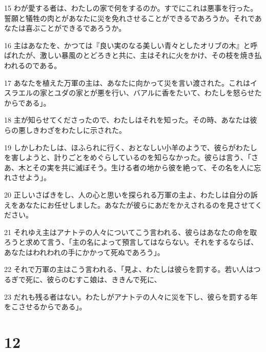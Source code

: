 \par 15 わが愛する者は、わたしの家で何をするのか。すでにこれは悪事を行った。誓願と犠牲の肉とがあなたに災を免れさせることができるであろうか。それであなたは喜ぶことができるであろうか。
\par 16 主はあなたを、かつては『良い実のなる美しい青々としたオリブの木』と呼ばれたが、激しい暴風のとどろきと共に、主はそれに火をかけ、その枝を焼き払われるのである。
\par 17 あなたを植えた万軍の主は、あなたに向かって災を言い渡された。これはイスラエルの家とユダの家とが悪を行い、バアルに香をたいて、わたしを怒らせたからである」。
\par 18 主が知らせてくださったので、わたしはそれを知った。その時、あなたは彼らの悪しきわざをわたしに示された。
\par 19 しかしわたしは、ほふられに行く、おとなしい小羊のようで、彼らがわたしを害しようと、計りごとをめぐらしているのを知らなかった。彼らは言う、「さあ、木とその実を共に滅ぼそう。生ける者の地から彼を絶って、その名を人に忘れさせよう」。
\par 20 正しいさばきをし、人の心と思いを探られる万軍の主よ、わたしは自分の訴えをあなたにお任せしました。あなたが彼らにあだをかえされるのを見させてください。
\par 21 それゆえ主はアナトテの人々についてこう言われる、彼らはあなたの命を取ろうと求めて言う、「主の名によって預言してはならない。それをするならば、あなたはわれわれの手にかかって死ぬであろう」。
\par 22 それで万軍の主はこう言われる、「見よ、わたしは彼らを罰する。若い人はつるぎで死に、彼らのむすこ娘は、ききんで死に、
\par 23 だれも残る者はない。わたしがアナトテの人々に災を下し、彼らを罰する年をこさせるからである」。

\chapter{12}

